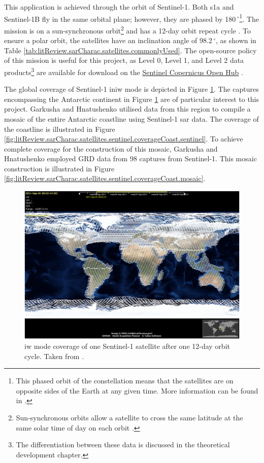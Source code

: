 This application is achieved through the orbit of Sentinel-1. Both \ac{s1a} and Sentinel-1B fly in the same orbital plane; however, they are phased by 180\,$^{\circ}$\footnote{This phased orbit of the constellation means that the satellites are on opposite sides of the Earth at any given time. More information can be found in \cite{Geudtner2014}.}. The mission is on a sun-synchronous orbit\footnote{Sun-synchronous orbits allow a satellite to cross the same latitude at the same solar time of day on each orbit \cite{Hulley2019}.} and has a 12-day orbit repeat cycle \cite{Torres2012}. To ensure a polar orbit, the satellites have an inclination angle of 98.2\,$^{\circ}$, as shown in Table \ref{tab:litReview.sarCharac.satellites.commonlyUsed}. The open-source policy of this mission is useful for this project, as Level 0, Level 1, and Level 2 data products\footnote{The differentiation between these data is discussed in the theoretical development chapter.} are available for download on the \href{https://scihub.copernicus.eu/dhus/#/home}{Sentinel Copernicus Open Hub} \cite{Potin2019}.

The global coverage of Sentinel-1 in\acf{iw} mode is depicted in Figure \ref{fig:litReview.sarCharac.satellites.sentinel.coverage}. The captures encompassing the Antarctic continent in Figure \ref{fig:litReview.sarCharac.satellites.sentinel.coverage} are of particular interest to this project. Garkusha and Hnatushenko \cite{Garkusha2020} utilised data from this region to compile a mosaic of the entire Antarctic coastline using Sentinel-1 \acs{sar} data. The coverage of the coastline is illustrated in Figure \ref{fig:litReview.sarCharac.satellites.sentinel.coverageCoast.sentinel}. To achieve complete coverage for the construction of this mosaic, Garkusha and Hnatushenko employed GRD data from 98 captures from Sentinel-1. This mosaic construction is illustrated in Figure \ref{fig:litReview.sarCharac.satellites.sentinel.coverageCoast.mosaic}.

\begin{figure}[H]
    \centering
    \includegraphics[width=.5\linewidth]{Figures/LiteratureReview/Satellites/sentinelCoverage.jpg}
    \caption{\ac{iw} mode coverage of one Sentinel-1 satellite after one 12-day orbit cycle. Taken from \cite{Torres2012b}.}
    \label{fig:litReview.sarCharac.satellites.sentinel.coverage}
\end{figure}

